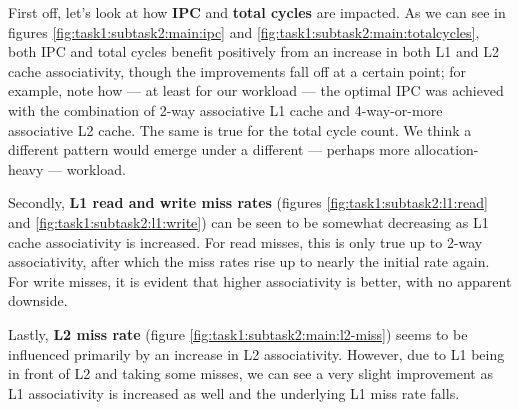 \documentclass[10pt]{article}
\begin{document}
First off, let's look at how \textbf{IPC} and \textbf{total cycles} are impacted.
As we can see in figures \ref{fig:task1:subtask2:main:ipc} and \ref{fig:task1:subtask2:main:totalcycles}, both IPC and total cycles benefit positively from an increase in both L1 and L2 cache associativity, though the improvements fall off at a certain point; for example, note how --- at least for our workload --- the optimal IPC was achieved with the combination of 2-way associative L1 cache and 4-way-or-more associative L2 cache. The same is true for the total cycle count. We think a different pattern would emerge under a different --- perhaps more allocation-heavy --- workload.

Secondly, \textbf{L1 read and write miss rates} (figures \ref{fig:task1:subtask2:l1:read} and \ref{fig:task1:subtask2:l1:write}) can be seen to be somewhat decreasing as L1 cache associativity is increased. For read misses, this is only true up to 2-way associativity, after which the miss rates rise up to nearly the initial rate again. For write misses, it is evident that higher associativity is better, with no apparent downside.

Lastly, \textbf{L2 miss rate} (figure \ref{fig:task1:subtask2:main:l2-miss}) seems to be influenced primarily by an increase in L2 associativity. However, due to L1 being in front of L2 and taking some misses, we can see a very slight improvement as L1 associativity is increased as well and the underlying L1 miss rate falls.
\end{document}

